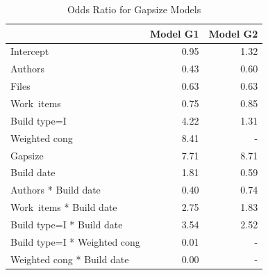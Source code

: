 \documentclass[12pt,oneside]{book}
\begin{document}
\begin{table}[h]
\begin{center}
\begin{tabular}{l|rr}
  \hline
 & Model G1 & Model G2 \\ 
  \hline
Intercept & 0.95 & 1.32 \\ 
  Authors & 0.43 & 0.60 \\ 
  Files & 0.63 & 0.63 \\ 
  Work~items & 0.75 & 0.85 \\ 
  Build type=I & 4.22 & 1.31 \\ 
  Weighted cong & 8.41 & - \\ 
  Gapsize & 7.71 & 8.71 \\ 
  Build date & 1.81 & 0.59 \\ 
  Authors * Build date & 0.40 & 0.74 \\ 
  Work~items * Build date & 2.75 & 1.83 \\ 
  Build type=I * Build date & 3.54 & 2.52 \\ 
  Build type=I * Weighted cong & 0.01 & - \\ 
  Weighted cong * Build date & 0.00 & - \\ 
   \hline
\end{tabular}
\caption{Odds Ratio for Gapsize Models}
\label{tab:oddsratio_gapsize}
\end{center}
\end{table}
\end{document}
